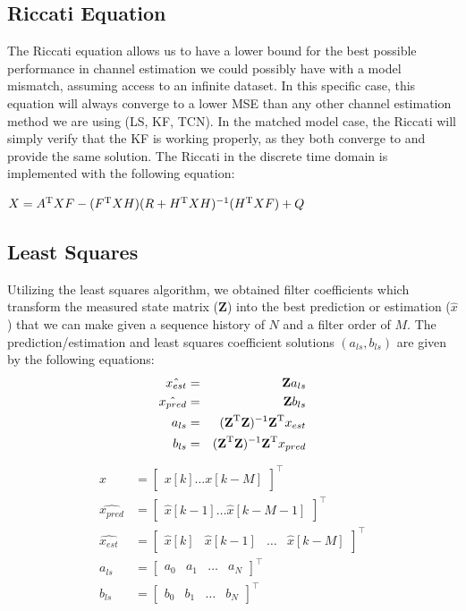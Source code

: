 \documentclass[twocolumn,letterpaper]{IEEEAerospaceCLS}  %
\begin{document}
\subsection{Riccati Equation}

The Riccati equation allows us to have a lower bound for the best possible performance in channel estimation we could possibly have with a model mismatch, assuming access to an infinite dataset. In this specific case, this equation will always converge to a lower MSE than any other channel estimation method we are using (LS, KF, TCN). In the matched model case, the Riccati will simply verify that the KF is working properly, as they both converge to and provide the same solution. The Riccati in the discrete time domain is implemented with the following equation: 

$X=A^{\rm T}XF-(F^{\rm T}XH)(R+H^{\rm T}XH)^{-1}(H^{\rm T}XF) + Q $

\subsection{Least Squares}

Utilizing the least squares algorithm, we obtained filter coefficients which transform the measured state matrix (\textbf{Z}) into the best prediction or estimation ($\hat{x}$) that we can make given a sequence history of $N$ and a filter order of $M$. The prediction/estimation and least squares coefficient solutions $(a_{ls}, b_{ls})$ are given by the following equations:
\begin{eqnarray*}
\hat{x_{est}}&=&\textbf{Z}a_{ls} \\ 
\hat{x_{pred}}&=&\textbf{Z}b_{ls} \\ 
a_{ls}&=&(\textbf{Z}^{\rm T}\textbf{Z})^{-1}\textbf{Z}^{\rm T}x_{est} \\
b_{ls}&=&(\textbf{Z}^{\rm T}\textbf{Z})^{-1}\textbf{Z}^{\rm T}x_{pred}
\end{eqnarray*}
\begin{align}
\begin{aligned}
x&= \left[ \begin{matrix}  x[k]   \dots    x[k-M] \end{matrix} \right]^\top\\
\hat{x_{pred}} &= \left[ \begin{matrix} \hat{x}[k-1]  \dots \hat{x}[k-M-1]\end{matrix} \right]^\top\\
\hat{x_{est}} &= \left[ \begin{matrix}   \hat{x}[k]  & \hat{x}[k-1]  &  \dots & \hat{x}[k-M]\end{matrix}\right]^\top\\ \nonumber
a_{ls}&=  \left[ \begin{matrix}    a_{0} &  a_{1} &  \dots  & a_{N} \end{matrix} \right]^\top\\
b_{ls}&= \left[ \begin{matrix}   b_{0}   & b_{1}  & \dots &  b_{N}\end{matrix}\right]^\top
\end{aligned}
\end{align}
\end{document}
